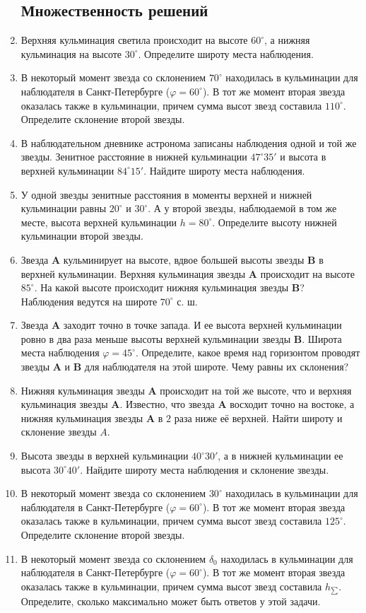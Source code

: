 \documentclass[12pt]{article}
\begin{document}
\begin{enumerate}
    \subsection*{Множественность решений}
    \item Верхняя кульминация светила происходит на высоте $60^{\circ}$, а нижняя кульминация на высоте $30^{\circ}$. Определите широту места наблюдения.
    \item В некоторый момент звезда со склонением $70^{\circ}$ находилась в кульминации для наблюдателя в Санкт-Петербурге ($\varphi=60^{\circ}$). В тот же момент вторая звезда оказалась также в кульминации, причем сумма высот звезд составила $110^{\circ}$. Определите склонение второй звезды.
    \item В наблюдательном дневнике астронома записаны наблюдения одной и той же звезды. Зенитное расстояние в нижней кульминации $47^{\circ}35'$ и высота в верхней кульминации $84^{\circ}15'$. Найдите широту места наблюдения.
    \item У одной звезды зенитные расстояния в моменты верхней и нижней кульминации равны $20^{\circ}$ и $30^{\circ}$. А у второй звезды, наблюдаемой в том же месте, высота верхней кульминации $h=80^{\circ}$. Определите высоту нижней кульминации второй звезды.
    \item Звезда \textbf{A} кульминирует на высоте, вдвое большей высоты звезды \textbf{B} в верхней кульминации. Верхняя кульминация звезды \textbf{A} происходит на высоте $85^{\circ}$. На какой высоте происходит нижняя  кульминация звезды \textbf{B}? Наблюдения ведутся на широте $70^{\circ}$ с. ш.
    \item Звезда \textbf{A} заходит точно в точке запада. И ее высота верхней кульминации ровно в два раза меньше высоты верхней кульминации звезды \textbf{B}. Широта места наблюдения $\varphi=45^{\circ}$. Определите, какое время над горизонтом проводят звезды \textbf{A} и \textbf{B} для наблюдателя на этой широте. Чему равны их склонения?
    \item Нижняя кульминация звезды \textbf{A} происходит на той же высоте, что и верхняя кульминация звезды \textbf{A}. Известно, что звезда \textbf{A} восходит точно на востоке, а нижняя кульминация звезды \textbf{A} в $2$ раза ниже её верхней. Найти широту и склонение звезды $A$.
    \item Высота звезды в верхней кульминации $40^{\circ}30'$, а в нижней кульминации ее высота $30^{\circ}40'$. Найдите широту места наблюдения и склонение звезды.
    \item В некоторый момент звезда со склонением $30^{\circ}$ находилась в кульминации для наблюдателя в Санкт-Петербурге ($\varphi=60^{\circ}$). В тот же момент вторая звезда оказалась также в кульминации, причем сумма высот звезд составила $125^{\circ}$. Определите склонение второй звезды. 
    \item В некоторый момент звезда со склонением $\delta_0$ находилась в кульминации для наблюдателя в Санкт-Петербурге ($\varphi=60^{\circ}$). В тот же момент вторая звезда оказалась также в кульминации, причем сумма высот звезд составила $h_{\sum}$. Определите, сколько максимально может быть ответов у этой задачи.
\end{enumerate}
\end{document}
